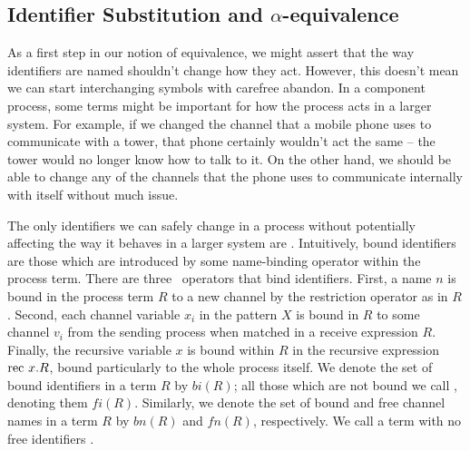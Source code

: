 \subsection{Identifier Substitution and $\alpha$-equivalence}\label{secSubst}
	As a first step in our notion of equivalence, we might assert that the way identifiers are named shouldn't change how they act.  
However, this doesn't mean we can start interchanging symbols with carefree abandon.  
In a component process, some terms might be important for how the process acts in a larger system.  
For example, if we changed the channel that a mobile phone uses to communicate with a tower, that phone certainly wouldn't act the same -- the tower would no longer know how to talk to it.  
On the other hand, we should be able to change any of the channels that the phone uses to communicate internally with itself without much issue.
	
	The only identifiers we can safely change in a process without potentially affecting the way it behaves in a larger system are .\!\!\!\!
Intuitively, bound identifiers are those which are introduced by some name-binding operator within the process term.
There are three \picalc\ operators that bind identifiers.
First, a name $n$ is bound in the process term $R$ to a new channel by the restriction operator as in $R$.  
Second, each channel variable $x_i$ in the pattern $X$ is bound in $R$ to some channel $v_i$ from the sending process when matched in a receive expression $R$.  
Finally, the recursive variable $x$ is bound within $R$ in the recursive expression $\text{rec }{x}.R$, bound particularly to the whole process itself.
	We denote the set of bound identifiers in a term $R$ by $bi(R)$; all those which are not bound we call , denoting them $fi(R)$.  
Similarly, we denote the set of bound and free channel names in a term $R$ by $bn(R)$ and $fn(R)$, respectively.  
We call a term with no free identifiers .
	
